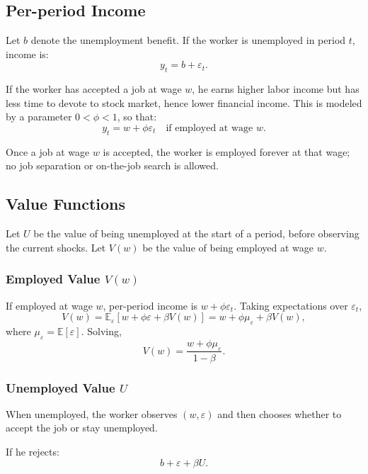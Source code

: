 \documentclass{article}
\begin{document}
	\subsection*{Per-period Income}
	
	Let $b$ denote the unemployment benefit.  
	If the worker is unemployed in period $t$, income is:
	\[
	y_t = b + \varepsilon_t.
	\]
	
	If the worker has accepted a job at wage $w$, he earns higher labor income but has less time to devote to stock market, hence lower financial income.  
	This is modeled by a parameter $0 < \phi < 1$, so that:
	\[
	y_t = w + \phi \varepsilon_t \quad \text{if employed at wage } w.
	\]
	
	Once a job at wage $w$ is accepted, the worker is employed forever at that wage; no job separation or on-the-job search is allowed.
	
	\subsection*{Value Functions}
	
	Let $U$ be the value of being unemployed at the start of a period, before observing the current shocks.  
	Let $V(w)$ be the value of being employed at wage $w$.
	
	\subsubsection*{Employed Value $V(w)$}
	
	If employed at wage $w$, per-period income is $w + \phi \varepsilon_t$.  
	Taking expectations over $\varepsilon_t$,
	\[
	V(w) = \mathbb{E}_\varepsilon[w + \phi \varepsilon + \beta V(w)]
	= w + \phi \mu_\varepsilon + \beta V(w),
	\]
	where $\mu_\varepsilon = \mathbb{E}[\varepsilon]$.  
	Solving,
	\begin{equation}
		\label{eq:Vw}
		V(w) = \frac{w + \phi\mu_\varepsilon}{1-\beta}.
	\end{equation}
	
	\subsubsection*{Unemployed Value $U$}
	
	When unemployed, the worker observes $(w,\varepsilon)$ and then chooses whether to accept the job or stay unemployed.  
	
	If he rejects:
	\[
	b + \varepsilon + \beta U.
	\]
	
\end{document}
